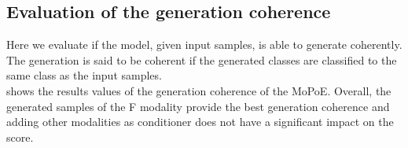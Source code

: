\documentclass{midl} %
\begin{document}
    
    
    
    
    \subsection{Evaluation of the generation coherence}
    
    Here we evaluate if the model, given input samples, is able to generate coherently.
    The generation is said to be coherent if the generated classes are classified to the same class as the input samples.\\
     shows the results values of the generation coherence of the MoPoE.
    Overall, the generated samples of the F modality provide the best generation coherence and adding other modalities as conditioner does not have a significant impact on the score.
    
\end{document}
